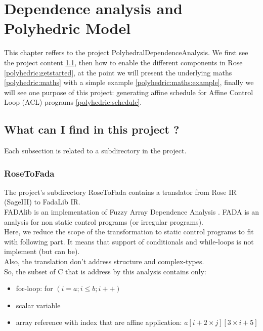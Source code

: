 \chapter{Dependence analysis and Polyhedric Model}
\label{polyhedric:polyhedric}

	This chapter reffers to the project PolyhedralDependenceAnalysis. We first see the project content
\ref{polyhedric:insideproject}, then how to enable the different components in Rose \ref{polyhedric:getstarted}, at the point
we will present the underlying maths \ref{polyhedric:maths} with a simple example \ref{polyhedric:maths:example}, finally we
will see one purpose of this project: generating affine schedule for Affine Control Loop (ACL) programs \ref{polyhedric:schedule}.

	\section{What can I find in this project ?}
	\label{polyhedric:insideproject}
	
	Each subsection is related to a subdirectory in the project.
	
		\subsection{RoseToFada}
	
	The project's subdirectory RoseToFada contains a translator from Rose IR (SageIII) to FadaLib IR.\\
	FADAlib \cite{FADAweb} is an implementation of Fuzzy Array Dependence Analysis \cite{FADA}. FADA is an 
analysis for non static control programs (or irregular programs).\\
	Here, we reduce the scope of the transformation to static control programs \cite{Feautrier} to fit with 
following part. It means that support of conditionals and while-loops is not implement (but can be).\\
	Also, the translation don't address structure and complex-types.\\
	
	So, the subset of C that is address by this analysis contains only:
\begin{itemize}
	\item for-loop: for $(i = a; i \leq b; i++)$
	\item scalar variable
	\item array reference with index that are affine application: $a[i + 2 \times j][3 \times i + 5]$
\end{itemize}
	
